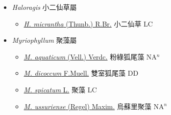 
  \begin{itemize}
 \item[] \textit{Haloragis} 小二仙草屬
                    
  \begin{itemize}
        \item[] \href{http://www.theplantlist.org/tpl1.1/search?q=Haloragis+micrantha}{\textit{H. micrantha} (Thunb.) R.Br.}   小二仙草 LC
  \end{itemize}
 \item[] \textit{Myriophyllum} 聚藻屬
                    
  \begin{itemize}
        \item[] \href{http://www.theplantlist.org/tpl1.1/search?q=Myriophyllum+aquaticum}{\textit{M. aquaticum} (Vell.) Verdc.}   粉綠狐尾藻 NA$^n$
        \item[] \href{http://www.theplantlist.org/tpl1.1/search?q=Myriophyllum+dicoccum}{\textit{M. dicoccum} F.Muell.}   雙室狐尾藻 DD
        \item[] \href{http://www.theplantlist.org/tpl1.1/search?q=Myriophyllum+spicatum}{\textit{M. spicatum} L.}   聚藻 LC
        \item[] \href{http://www.theplantlist.org/tpl1.1/search?q=Myriophyllum+ussuriense}{\textit{M. ussuriense} (Regel) Maxim.}   烏蘇里聚藻 NA$^n$
  \end{itemize}
  \end{itemize}
